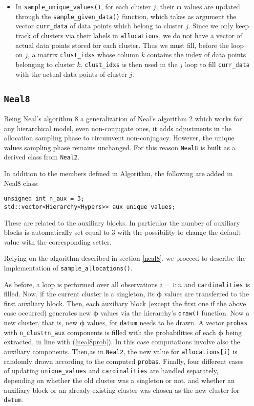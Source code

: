 \begin{itemize}
	\item In \verb|sample_unique_values()|, for each cluster $j$, their $\boldsymbol\phi$ values are updated through the \verb|sample_given_data()| function, which takes as argument the vector \verb|curr_data| of data points which belong to cluster $j$.
	Since we only keep track of clusters via their labels in \verb|allocations|, we do not have a vector of actual data points stored for each cluster.
	Thus we must fill, before the loop on $j$, a matrix \verb|clust_idxs| whose column $k$ contains the index of data points belonging to cluster $k$.
	\verb|clust_idxs| is then used in the $j$ loop to fill \verb|curr_data| with the actual data points of cluster $j$.

\end{itemize}


\subsection{\texttt{Neal8}}

Being Neal's algorithm 8 a generalization of Neal's algorithm 2 which works for any hierarchical model, even non-conjugate ones, it adds adjustments in the allocation sampling phase to circumvent non-conjugacy.
However, the unique values sampling phase remains unchanged. For this reason \verb|Neal8| is built as a derived class from \verb|Neal2|.

In addition to the members defined in Algorithm, the following are added in Neal8 class:
\begin{verbatim}
unsigned int n_aux = 3;
std::vector<Hierarchy<Hypers>> aux_unique_values;
\end{verbatim}
These are related to the auxiliary blocks. In particular the number of auxiliary blocks is automatically set equal to 3 with the possibility to change the default value with the corresponding setter.

Relying on the algorithm described in section \ref{neal8}, we proceed to describe the implementation of \verb|sample_allocations()|.

As before, a loop is performed over all observations $i=1:n$ and \verb|cardinalities| is filled. Now, if the current cluster is a singleton, its $\boldsymbol\phi$ values are transferred to the first auxiliary block. Then, each auxiliary block (except the first one if the above case occurred) generates new $\boldsymbol\phi$ values via the hierarchy's \verb|draw()| function. Now a new cluster, that is, new $\boldsymbol\phi$ values, for \verb|datum| needs to be drawn. 	A vector \verb|probas| with \verb|n_clust+n_aux| components is filled with the probabilities of each $\boldsymbol\phi$ being extracted, in line with (\ref{neal8prob}). In this case computations involve also the auxiliary components. Then,as in \verb|Neal2|, the new value for \verb|allocations[i]| is randomly drawn according to the computed \verb|probas|. Finally, four different cases of updating \verb|unique_values| and \verb|cardinalities| are handled separately, depending on whether the old cluster was a singleton or not, and whether an auxiliary block or an already existing cluster was chosen as the new cluster for \verb|datum|.
